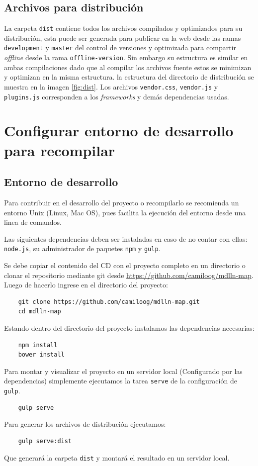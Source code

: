 \documentclass[11pt,letterpaper]{article}
\begin{document}
\subsection{Archivos para distribución}

La carpeta {\tt dist} contiene todos los archivos compilados y optimizados para su distribución, esta puede ser generada para publicar en la web desde las ramas {\tt development} y {\tt master} del control de versiones y optimizada para compartir {\it offline} desde la rama {\tt offline-version}. Sin embargo su estructura es similar en ambas compilaciones dado que al compilar los archivos fuente estos se minimizan y optimizan en la misma estructura. la estructura del directorio de distribución se muestra en la imagen \ref{fig:dist}. Los archivos {\tt vendor.css}, {\tt vendor.js} y {\tt plugins.js} corresponden a los {\it frameworks} y demás dependencias usadas.

\section{Configurar entorno de desarrollo para recompilar}

\subsection{Entorno de desarrollo}

Para contribuir en el desarrollo del proyecto o recompilarlo se recomienda un entorno Unix (Linux, Mac OS), pues facilita la ejecución del entorno desde una linea de comandos. 

Las siguientes dependencias deben ser instaladas en caso de no contar con ellas: {\tt node.js}, su administrador de paquetes {\tt npm} y {\tt gulp}.

Se debe copiar el contenido del CD con el proyecto completo en un directorio o clonar el repositorio mediante git desde \url{https://github.com/camiloog/mdlln-map}. Luego de hacerlo ingrese en el directorio del proyecto:
\begin{lstlisting}
	git clone https://github.com/camiloog/mdlln-map.git
	cd mdlln-map
\end{lstlisting}
Estando dentro del directorio del proyecto instalamos las dependencias necesarias:
\begin{lstlisting}
	npm install
  	bower install
\end{lstlisting}
Para montar y visualizar el proyecto en un servidor local (Configurado por las dependencias) simplemente ejecutamos la tarea {\tt serve} de la configuración de {\tt gulp}.
\begin{lstlisting}
	gulp serve
\end{lstlisting}
Para generar los archivos de distribución ejecutamos:
\begin{lstlisting}
	gulp serve:dist
\end{lstlisting}
Que generará la carpeta {\tt dist} y montará el resultado en un servidor local.
\end{document}
